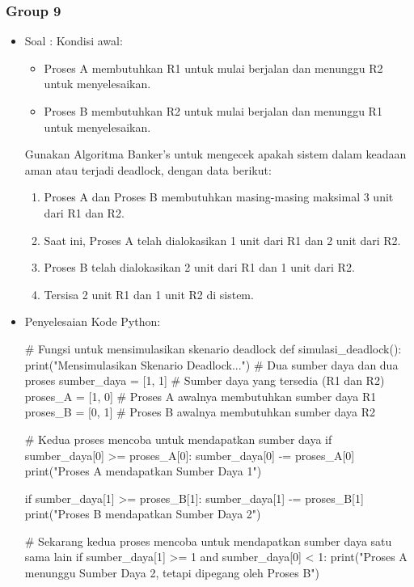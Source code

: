 \documentclass[12pt]{article}
\begin{document}
\subsubsection{Group 9}
\begin{itemize}
    \item Soal : 
    Kondisi awal:

    \begin{itemize}
        \item Proses A membutuhkan R1 untuk mulai berjalan dan menunggu R2 untuk menyelesaikan.
        \item Proses B membutuhkan R2 untuk mulai berjalan dan menunggu R1 untuk menyelesaikan.
    \end{itemize}
    Gunakan Algoritma Banker's untuk mengecek apakah sistem dalam keadaan aman atau terjadi deadlock, dengan data berikut:
    \begin{enumerate}
        \item Proses A dan Proses B membutuhkan masing-masing maksimal 3 unit dari R1 dan R2.
        \item Saat ini, Proses A telah dialokasikan 1 unit dari R1 dan 2 unit dari R2.
        \item Proses B telah dialokasikan 2 unit dari R1 dan 1 unit dari R2.
        \item Tersisa 2 unit R1 dan 1 unit R2 di sistem.
    \end{enumerate}

    \item Penyelesaian Kode Python:
    \begin{python}
# Fungsi untuk mensimulasikan skenario deadlock
def simulasi_deadlock():
    print("Mensimulasikan Skenario Deadlock...")
    # Dua sumber daya dan dua proses
    sumber_daya = [1, 1]  # Sumber daya yang tersedia (R1 dan R2)
    proses_A = [1, 0]  # Proses A awalnya membutuhkan sumber daya R1
    proses_B = [0, 1]  # Proses B awalnya membutuhkan sumber daya R2
    
    # Kedua proses mencoba untuk mendapatkan sumber daya
    if sumber_daya[0] >= proses_A[0]:
        sumber_daya[0] -= proses_A[0]
        print("Proses A mendapatkan Sumber Daya 1")

    if sumber_daya[1] >= proses_B[1]:
        sumber_daya[1] -= proses_B[1]
        print("Proses B mendapatkan Sumber Daya 2")
    
    # Sekarang kedua proses mencoba untuk mendapatkan sumber daya satu sama lain
    if sumber_daya[1] >= 1 and sumber_daya[0] < 1:
        print("Proses A menunggu Sumber Daya 2, tetapi dipegang oleh Proses B")


\end{python}
\end{itemize}
\end{document}
